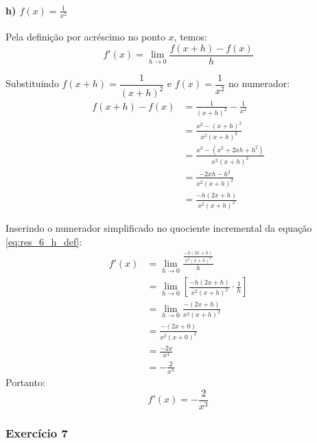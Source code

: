 \setcounter{equation}{0}
\paragraph{h) $f(x) = \frac{1}{x^2}$}

Pela definição por acréscimo no ponto $x$, temos:
\begin{equation}
f'(x) = \lim_{h \to 0} \frac{f(x + h) - f(x)}{h} \label{eq:res_6_h_def}
\end{equation}

Substituindo $f(x + h) = \dfrac{1}{(x + h)^2}$ e $f(x) = \dfrac{1}{x^2}$ no numerador:
\begin{align*}
f(x + h) - f(x) &= \frac{1}{(x + h)^2} - \frac{1}{x^2} \\
&= \frac{x^2 - (x + h)^2}{x^2(x + h)^2} \\
&= \frac{x^2 - (x^2 + 2xh + h^2)}{x^2(x + h)^2} \\
&= \frac{-2xh - h^2}{x^2(x + h)^2} \\
&= \frac{-h(2x + h)}{x^2(x + h)^2}
\end{align*}

Inserindo o numerador simplificado no quociente incremental da equação \eqref{eq:res_6_h_def}:
\begin{align*}
f'(x) &= \lim_{h \to 0} \frac{\frac{-h(2x + h)}{x^2(x + h)^2}}{h} \\
      &= \lim_{h \to 0} \left[ \frac{-h(2x + h)}{x^2(x + h)^2} \cdot \frac{1}{h} \right] \\
      &= \lim_{h \to 0} \frac{-(2x + h)}{x^2(x + h)^2} \\
      &= \frac{-(2x + 0)}{x^2(x + 0)^2} \\
      &= \frac{-2x}{x^4} \\
      &= -\frac{2}{x^3}
\end{align*}
Portanto:
\[
  f'(x) = -\frac{2}{x^3}
\]

\vspace{0.6cm}
\subsubsection*{Exercício 7}

